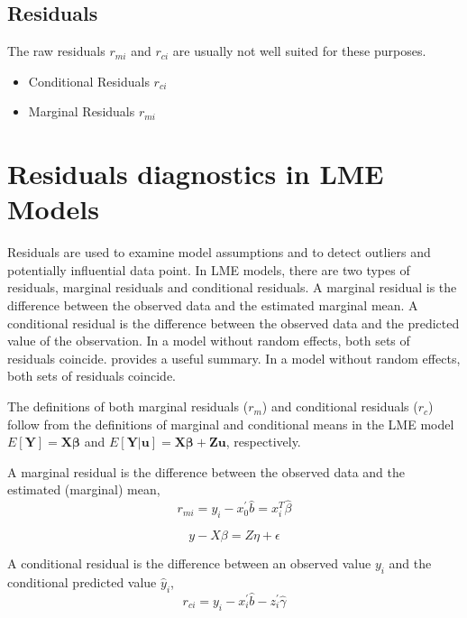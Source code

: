 \documentclass[12pt, a4paper]{report}
\theoremstyle{plain}
\theoremstyle{definition}
\theoremstyle{remark}
\begin{document}


	\section*{Residuals}
	
 The raw residuals $r_{mi}$ and $r_{ci}$ are usually not well suited for these purposes.
	
	\begin{itemize}
		\item Conditional Residuals $r_{ci}$
		\item Marginal Residuals $r_{mi}$
	\end{itemize}
	
	
	
	
	
\chapter{Residuals diagnostics in LME Models}
	Residuals are used to examine model assumptions and to detect outliers and potentially influential data
	point. In LME models, there are two types of residuals, marginal residuals and conditional residuals. A marginal residual is the difference between the observed data and the estimated marginal mean. A conditional residual is the difference between the observed data and the predicted value of the observation. In a model without random effects, both sets of residuals coincide. \citet{schabenberger} provides a useful summary. In a model without random effects, both sets of residuals coincide.

The definitions of both marginal residuals ($r_m$) and conditional residuals ($r_c$) follow from the definitions of marginal and conditional means in the LME model 
$E[\boldsymbol{Y}] = \boldsymbol{X}\boldsymbol{\beta}$ and $E[\boldsymbol{Y|\boldsymbol{u}}] = \boldsymbol{X}\boldsymbol{\beta} + \boldsymbol{Z}\boldsymbol{u}$, respectively.

 A marginal residual is the difference between the observed data and the estimated (marginal) mean, 
  \[r_{mi} = y_i - x_0^{\prime} \hat{b} =x^{T}_{i}\hat{\beta}\]
  
  	\[y - X\beta = Z \eta +\epsilon \]
 
 A conditional residual is the difference between an observed value $y_{i}$ and the conditional predicted value $\hat{y}_{i} $,
	\[r_{ci} = y_i - x_i^{\prime} \hat{b} - z_i^{\prime} \hat{\gamma}\]
\end{document}
